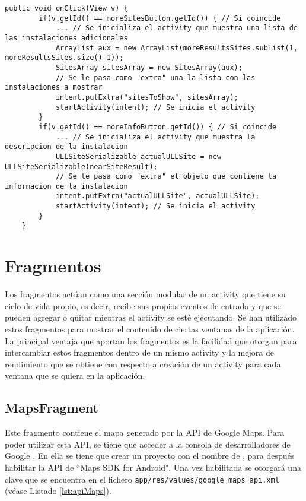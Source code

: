 \begin{lstlisting}[caption={Fichero \texttt{ARNavigation.java}, código para manejar los eventos de los botones.},  label={lst:infobutton}]
    public void onClick(View v) {
        if(v.getId() == moreSitesButton.getId()) { // Si coincide
            ... // Se inicializa el activity que muestra una lista de las instalaciones adicionales
            ArrayList aux = new ArrayList(moreResultsSites.subList(1, moreResultsSites.size()-1));
            SitesArray sitesArray = new SitesArray(aux);
            // Se le pasa como "extra" una la lista con las instalaciones a mostrar
            intent.putExtra("sitesToShow", sitesArray);
            startActivity(intent); // Se inicia el activity
        }
        if(v.getId() == moreInfoButton.getId()) { // Si coincide
            ... // Se inicializa el activity que muestra la descripcion de la instalacion
            ULLSiteSerializable actualULLSite = new ULLSiteSerializable(nearSiteResult);
            // Se le pasa como "extra" el objeto que contiene la informacion de la instalacion
            intent.putExtra("actualULLSite", actualULLSite);
            startActivity(intent); // Se inicia el activity
        }
    }
\end{lstlisting}

\section{Fragmentos}

Los fragmentos \cite{URL::fragment} actúan como una sección modular de un activity que tiene su ciclo de vida propio, es decir, recibe sus propios eventos de entrada y que se pueden agregar o quitar mientras el activity se esté ejecutando. Se han utilizado estos fragmentos para mostrar el contenido de ciertas ventanas de la aplicación. La principal ventaja que  aportan los fragmentos es la facilidad que otorgan para intercambiar estos fragmentos dentro de un mismo activity y la mejora de rendimiento que se obtiene con respecto a creación de un activity para cada ventana que se quiera en la aplicación.

\subsection{MapsFragment}
       
Este fragmento contiene el mapa generado por la API de Google Maps. Para poder utilizar esta API, se tiene que acceder a la consola de desarrolladores de Google \cite{URL::consoleGoogle}. En ella se tiene que crear un proyecto con el nombre de \ULLAR{}, para después habilitar la API de ``Maps SDK for Android". Una vez habilitada se otorgará una clave que se encuentra en el fichero \texttt{app/res/values/google\_maps\_api.xml} (véase Listado \ref{lst:apiMaps}).

